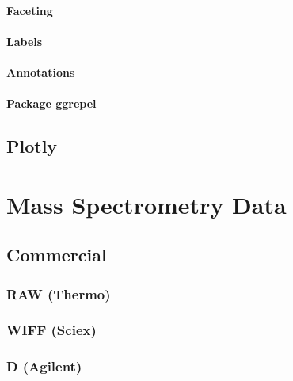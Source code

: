 \documentclass[
]{book}
\begin{document}
\hypertarget{faceting}{%
\subsubsection{Faceting}\label{faceting}}

\hypertarget{labels}{%
\subsubsection{Labels}\label{labels}}

\hypertarget{annotations}{%
\subsubsection{Annotations}\label{annotations}}

\hypertarget{package-ggrepel}{%
\subsubsection{Package ggrepel}\label{package-ggrepel}}

\hypertarget{plotly}{%
\section{Plotly}\label{plotly}}

\hypertarget{mass-spectrometry-data}{%
\chapter{Mass Spectrometry Data}\label{mass-spectrometry-data}}

\hypertarget{commercial}{%
\section{Commercial}\label{commercial}}

\hypertarget{raw-thermo}{%
\subsection{RAW (Thermo)}\label{raw-thermo}}

\hypertarget{wiff-sciex}{%
\subsection{WIFF (Sciex)}\label{wiff-sciex}}

\hypertarget{d-agilent}{%
\subsection{D (Agilent)}\label{d-agilent}}
\end{document}
